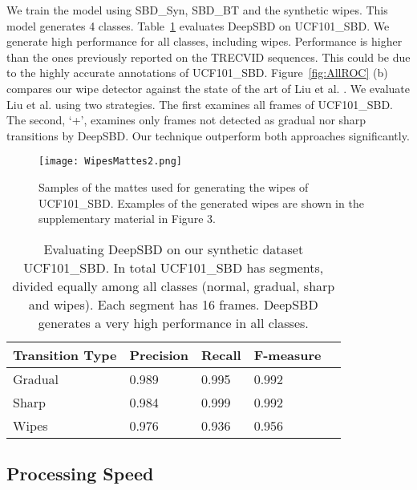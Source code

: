 \documentclass[journal]{IEEEtran}
\begin{document}
We train the model using SBD\_Syn, SBD\_BT and the synthetic wipes. This model generates 4 classes. Table~\ref{tab:UCF101_SBD} evaluates DeepSBD on UCF101\_SBD. 
We generate high performance for all classes, including wipes. Performance is higher than the ones previously reported on the TRECVID sequences. This could be due to the highly accurate annotations of UCF101\_SBD. Figure~\ref{fig:AllROC} (b) compares our wipe detector against the state of the art of Liu et al. \cite{Liu07}. We evaluate Liu et al. using two strategies. The first examines all frames of UCF101\_SBD. The second, `+', examines only frames not detected as gradual nor sharp transitions by DeepSBD. Our technique outperform both approaches significantly.  

\begin{figure}
  \centering
   \texttt{[image: WipesMattes2.png]}
   \caption{Samples of the  mattes used for generating the wipes of UCF101\_SBD. Examples of the generated wipes are shown in the supplementary material in Figure 3.}
\label{fig:Wipes}
 \end{figure}



\begin{table}
\small
\centering
\begin{tabular}{| l | l | l | l | l | }
     \hline      
			Transition Type							    & Precision      & Recall   & F-measure     \\
     \hline
					Gradual              	& 0.989	& 0.995	& 0.992 \\
			   Sharp                 & 0.984	& 0.999	& 0.992 \\
				 Wipes                & 0.976	& 0.936	& 0.956 \\
\hline 
    \end{tabular}\vspace{3pt}
\caption{Evaluating DeepSBD on our synthetic dataset UCF101\_SBD. In total UCF101\_SBD has  segments, divided equally among all classes (normal, gradual, sharp and wipes). Each segment has 16 frames. DeepSBD generates a very high performance in all classes.}
\label{tab:UCF101_SBD}
\end{table}




\subsection{Processing Speed}
\end{document}
